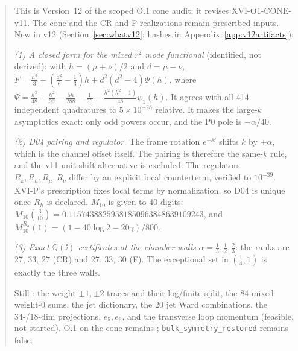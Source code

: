 \begin{abstract}
This is Version~12 of the scoped O.1 cone audit; it revises
XVI-O1-CONE-v11. The cone and the CR and F realizations remain
prescribed inputs. New in v12 (Section~\ref{sec:whatv12}; hashes in
Appendix~\ref{app:v12artifacts}):

\emph{(1) A closed form for the mixed \(r^2\) mode functional}
(identified, not derived): with \(h=(\mu+\nu)/2\) and \(d=\mu-\nu\),
\(F=\tfrac{h^3}3+(\tfrac{d^2}6-\tfrac13)h+d^2(d^2-4)\Psi(h)\), where
\(\Psi=\tfrac{h^3}{48}+\tfrac{h^2}{96}-\tfrac{5h}{288}-\tfrac1{96}-\tfrac{h^2(h^2-1)}{48}\psi_1(h)\).
It agrees with all 414 independent quadratures to
\(5\times10^{-28}\) relative. It makes the large-\(k\) asymptotics
exact: only odd powers occur, and the P0 pole is \(-\alpha/40\).

\emph{(2) D04 pairing and regulator.} The frame rotation
\(e^{\pm\ii\theta}\) shifts \(k\) by \(\pm\alpha\), which is the
channel offset itself. The pairing is therefore the same-\(k\) rule,
and the v11 unit-shift alternative is excluded. The regulators
\(R_k,R_h,R_\mu,R_\nu\) differ by an explicit local counterterm,
verified to \(10^{-39}\). XVI-P's prescription fixes local terms by
normalization, so D04 is unique once \(R_h\) is declared.
\(M_{10}\) is given to 40 digits:
\(M_{10}(\tfrac3{10})=0.11574388259581850963848639109243\), and
\(M_{10}^{R_h}(1)=(1-40\log2-20\gamma)/800\).

\emph{(3) Exact \(\mathbb Q(\ii)\) certificates at the chamber walls}
\(\alpha=\tfrac13,\tfrac12,\tfrac23\): the ranks are 27, 33, 27 (CR)
and 27, 33, 30 (F). The exceptional set in \((\tfrac14,1)\) is
exactly the three walls.

Still \OPEN: the weight-\(\pm1,\pm2\) traces and their log/finite
split, the 84 mixed weight-0 sums, the jet dictionary, the 20 jet
Ward combinations, the 34-/18-dim projections, \(e_5,e_6\), and the
transverse loop momentum (feasible, not started). O.1 on the cone
remains \NOTCLOSED; \texttt{bulk\_symmetry\_restored} remains false.
\end{abstract}
